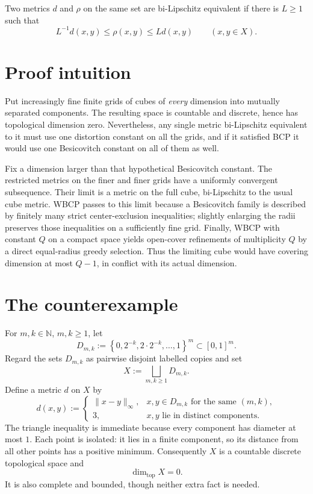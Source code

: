 \documentclass[11pt]{article}
\newcommand{\N}{\mathbb N}
\begin{document}
Two metrics $d$ and $\rho$ on the same set are bi-Lipschitz equivalent if
there is $L\geq 1$ such that
\[
 L^{-1}d(x,y)\leq \rho(x,y)\leq Ld(x,y)
 \qquad(x,y\in X).
\]

\section{Proof intuition}

Put increasingly fine finite grids of cubes of \emph{every} dimension into
mutually separated components.  The resulting space is countable and
discrete, hence has topological dimension zero.  Nevertheless, any single
metric bi-Lipschitz equivalent to it must use one distortion constant on all
the grids, and if it satisfied BCP it would use one Besicovitch constant on
all of them as well.

Fix a dimension larger than that hypothetical Besicovitch constant.  The
restricted metrics on the finer and finer grids have a uniformly convergent
subsequence.  Their limit is a metric on the full cube, bi-Lipschitz to the
usual cube metric.  WBCP passes to this limit because a Besicovitch family is
described by finitely many strict center-exclusion inequalities; slightly
enlarging the radii preserves those inequalities on a sufficiently fine
grid.  Finally, WBCP with constant $Q$ on a compact space yields open-cover
refinements of multiplicity $Q$ by a direct equal-radius greedy selection.
Thus the limiting cube would have covering dimension at most $Q-1$, in
conflict with its actual dimension.

\section{The counterexample}

For $m,k\in\N$, $m,k\geq1$, let
\[
 D_{m,k}:=\left\{0,2^{-k},2\cdot2^{-k},\ldots,1\right\}^{m}
 \subset [0,1]^m.
\]
Regard the sets $D_{m,k}$ as pairwise disjoint labelled copies and set
\[
 X:=\bigsqcup_{m,k\geq1}D_{m,k}.
\]
Define a metric $d$ on $X$ by
\[
 d(x,y):=
 \begin{cases}
   \|x-y\|_\infty,&x,y\in D_{m,k}\text{ for the same }(m,k),\\
   3,&x,y\text{ lie in distinct components}.
 \end{cases}
\]
The triangle inequality is immediate because every component has diameter at
most $1$.  Each point is isolated: it lies in a finite component, so its
distance from all other points has a positive minimum.  Consequently $X$ is a
countable discrete topological space and
\[
 \dim_{\mathrm{top}}X=0.
\]
It is also complete and bounded, though neither extra fact is needed.
\end{document}
